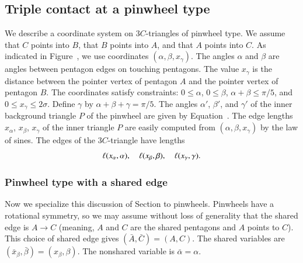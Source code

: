 \subsection{Triple contact at a pinwheel type}

We describe a coordinate system on $3C$-triangles of pinwheel type.
We assume that $C$ points into $B$, that $B$ points into $A$, and that
$A$ points into $C$.  As indicated in Figure~,
we use coordinates $(\alpha,\beta,x_\gamma)$.  The angles $\alpha$ and
$\beta$ are angles between pentagon edges on touching pentagons.  The
value $x_\gamma$ is the distance between the pointer vertex of
pentagon $A$ and the pointer vertex of pentagon $B$.  The coordinates
satisfy constraints: $0\le\alpha$, $0\le\beta$, $\alpha+\beta\le
\pi/5$, and $0\le x_\gamma\le 2\sigma$.  Define $\gamma$ by
$\alpha+\beta+\gamma=\pi/5$.  The angles $\alpha'$, $\beta'$, and
$\gamma'$ of the inner background triangle $P$ of the pinwheel are
given by Equation~.  The edge lengths $x_\alpha$,
$x_\beta$, $x_\gamma$ of the inner triangle $P$ are easily computed
from $(\alpha,\beta,x_\gamma)$ by the law of sines.  The edges of the
$3C$-triangle have lengths
\[
\ell(x_\alpha,\alpha),\quad 
\ell(x_\beta,\beta),\quad \ell(x_\gamma,\gamma).
\]


\subsubsection{Pinwheel type with a shared edge}

Now we specialize this discussion of Section  to
pinwheels.  Pinwheels have a rotational symmetry, so we may assume
without loss of generality that the shared edge is $A\to C$ (meaning,
$A$ and $C$ are the shared pentagons and $A$ points to $C$).  This
choice of shared edge gives $(\bar A,\bar C) = (A,C)$.  The shared
variables are $(\bar x_\beta,\bar\beta)=(x_\beta,\beta)$.  The
nonshared variable is $\bar\alpha=\alpha$.

